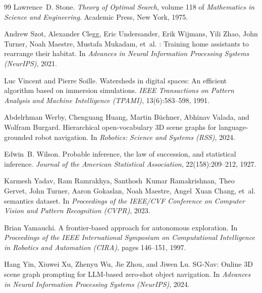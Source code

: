 \documentclass[10pt]{article}
\begin{document}
\begin{thebibliography}{99}
Lawrence~D. Stone.
\newblock \emph{Theory of Optimal Search}, volume 118 of \emph{Mathematics in Science and Engineering}.
\newblock Academic Press, New York, 1975.

Andrew Szot, Alexander Clegg, Eric Undersander, Erik Wijmans, Yili Zhao, John Turner, Noah Maestre, Mustafa Mukadam, et~al.
: Training home assistants to rearrange their habitat.
\newblock In \emph{Advances in Neural Information Processing Systems (NeurIPS)}, 2021.

Luc Vincent and Pierre Soille.
\newblock Watersheds in digital spaces: An efficient algorithm based on immersion simulations.
\newblock \emph{IEEE Transactions on Pattern Analysis and Machine Intelligence (TPAMI)}, 13(6):583--598, 1991.

Abdelrhman Werby, Chenguang Huang, Martin B{\"u}chner, Abhinav Valada, and Wolfram Burgard.
\newblock Hierarchical open-vocabulary 3D scene graphs for language-grounded robot navigation.
\newblock In \emph{Robotics: Science and Systems (RSS)}, 2024.

Edwin~B. Wilson.
\newblock Probable inference, the law of succession, and statistical inference.
\newblock \emph{Journal of the American Statistical Association}, 22(158):209--212, 1927.

Karmesh Yadav, Ram Ramrakhya, Santhosh~Kumar Ramakrishnan, Theo Gervet, John Turner, Aaron Gokaslan, Noah Maestre, Angel~Xuan Chang, et~al.
 semantics dataset.
\newblock In \emph{Proceedings of the IEEE/CVF Conference on Computer Vision and Pattern Recognition (CVPR)}, 2023.

Brian Yamauchi.
\newblock A frontier-based approach for autonomous exploration.
\newblock In \emph{Proceedings of the IEEE International Symposium on Computational Intelligence in Robotics and Automation (CIRA)}, pages 146--151, 1997.

Hang Yin, Xiuwei Xu, Zhenyu Wu, Jie Zhou, and Jiwen Lu.
\newblock SG-Nav: Online 3D scene graph prompting for LLM-based zero-shot object navigation.
\newblock In \emph{Advances in Neural Information Processing Systems (NeurIPS)}, 2024.


\end{thebibliography}
\end{document}
